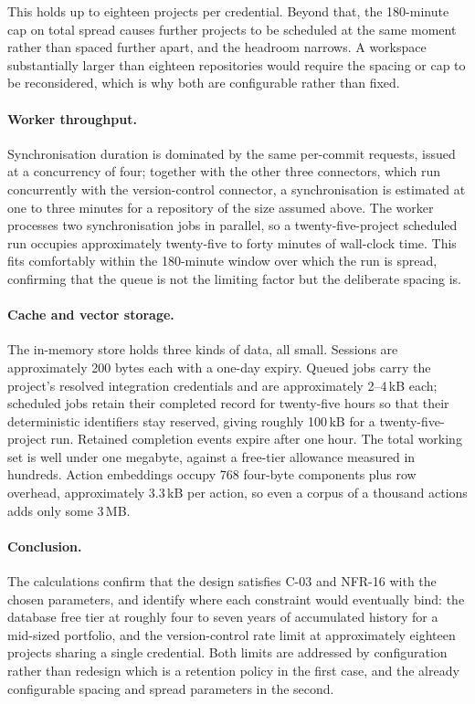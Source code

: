 This holds up to eighteen projects per credential. Beyond that, the
180-minute cap on total spread causes further projects to be scheduled at the
same moment rather than spaced further apart, and the headroom narrows. A
workspace substantially larger than eighteen repositories would require the
spacing or cap to be reconsidered, which is why both are configurable rather than
fixed.

\paragraph{Worker throughput.}
Synchronisation duration is dominated by the same per-commit requests, issued at
a concurrency of four; together with the other three connectors, which run
concurrently with the version-control connector, a synchronisation is estimated
at one to three minutes for a repository of the size assumed above. The worker
processes two synchronisation jobs in parallel, so a twenty-five-project
scheduled run occupies approximately twenty-five to forty minutes of wall-clock
time. This fits comfortably within the 180-minute window over which the run is
spread, confirming that the queue is not the limiting factor but the deliberate
spacing is.

\paragraph{Cache and vector storage.}
The in-memory store holds three kinds of data, all small. Sessions are
approximately 200 bytes each with a one-day expiry. Queued jobs carry the
project's resolved integration credentials and are approximately 2--4\,kB each;
scheduled jobs retain their completed record for twenty-five hours so that their
deterministic identifiers stay reserved, giving roughly 100\,kB for a
twenty-five-project run. Retained completion events expire after one hour. The
total working set is well under one megabyte, against a free-tier allowance
measured in hundreds. Action embeddings occupy 768 four-byte components plus row
overhead, approximately 3.3\,kB per action, so even a corpus of a thousand
actions adds only some 3\,MB.

\paragraph{Conclusion.}
The calculations confirm that the design satisfies C-03 and NFR-16 with the
chosen parameters, and identify where each constraint would eventually bind: the
database free tier at roughly four to seven years of accumulated history for a
mid-sized portfolio, and the version-control rate limit at approximately eighteen
projects sharing a single credential. Both limits are addressed by configuration
rather than redesign which is a retention policy in the first case, and the already
configurable spacing and spread parameters in the second.




